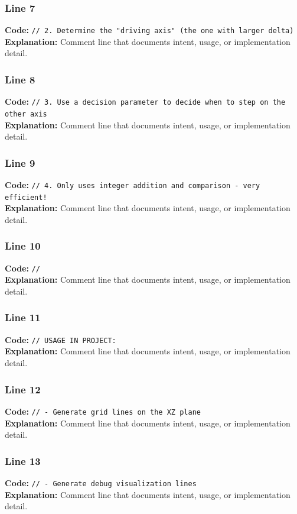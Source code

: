 \documentclass[11pt,a4paper]{article}
\begin{document}
\subsubsection*{Line 7}
\textbf{Code:} \verb|// 2. Determine the "driving axis" (the one with larger delta)|\\
\textbf{Explanation:} Comment line that documents intent, usage, or implementation detail.

\subsubsection*{Line 8}
\textbf{Code:} \verb|// 3. Use a decision parameter to decide when to step on the other axis|\\
\textbf{Explanation:} Comment line that documents intent, usage, or implementation detail.

\subsubsection*{Line 9}
\textbf{Code:} \verb|// 4. Only uses integer addition and comparison - very efficient!|\\
\textbf{Explanation:} Comment line that documents intent, usage, or implementation detail.

\subsubsection*{Line 10}
\textbf{Code:} \verb|//|\\
\textbf{Explanation:} Comment line that documents intent, usage, or implementation detail.

\subsubsection*{Line 11}
\textbf{Code:} \verb|// USAGE IN PROJECT:|\\
\textbf{Explanation:} Comment line that documents intent, usage, or implementation detail.

\subsubsection*{Line 12}
\textbf{Code:} \verb|// - Generate grid lines on the XZ plane|\\
\textbf{Explanation:} Comment line that documents intent, usage, or implementation detail.

\subsubsection*{Line 13}
\textbf{Code:} \verb|// - Generate debug visualization lines|\\
\textbf{Explanation:} Comment line that documents intent, usage, or implementation detail.
\end{document}
